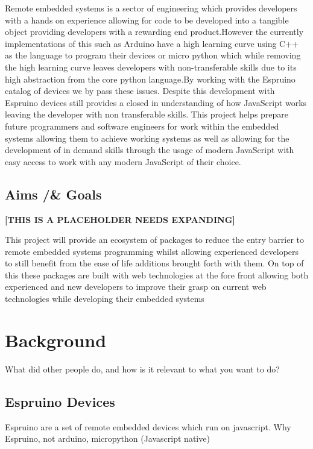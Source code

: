 \documentclass{l4proj}
\begin{document}
\text Remote embedded systems is a sector of engineering which provides developers with a hands on experience allowing for code to be developed into a tangible object providing developers with a rewarding end product.However  the  currently  implementations  of  this  such  as  Arduino  have  a  high  learning  curve  using  C++ as the language to program their devices or micro python which while removing the high learning curve leaves developers with non-transferable skills due to its high abstraction from the core python language.By working with the Espruino catalog of devices we by pass these issues.  Despite this development with Espruino devices still provides a closed in understanding of how JavaScript works leaving the developer with  non  transferable  skills.   This  project  helps  prepare  future  programmers  and  software  engineers  for work within the embedded systems allowing them to achieve working systems as well as allowing for the development of in demand skills through the usage of modern JavaScript with easy access to work with any modern JavaScript of their choice.

\section{Aims /& Goals}

\textbf{[THIS IS A PLACEHOLDER NEEDS EXPANDING]}

\text This project will provide an ecosystem of packages to reduce the entry barrier to remote embedded systems programming whilst allowing experienced developers to still benefit from the ease of life additions brought forth with them.  On top of this these packages are built with web technologies at the fore front allowing both experienced and new developers to improve their grasp on current web technologies while developing their embedded systems



\chapter{Background}
What did other people do, and how is it relevant to what you want to do?
\section{Espruino Devices}
\text    
    Espruino are a set of remote embedded devices which run on javascript. Why Espruino, not arduino, micropython (Javascript native)
    
\end{document}
